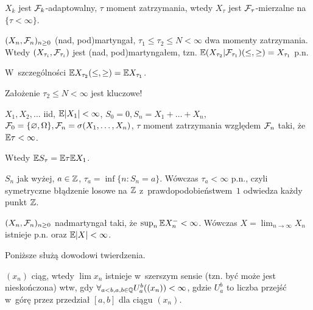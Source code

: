 



	\begin{proposition}
		$X_k$ jest $\mathcal{F}_k$-adaptowalny, $\tau$ moment zatrzymania, 
		wtedy $X_\tau$ jest $\mathcal{F}_\tau$-mierzalne na $\{ \tau < \infty\}$.
	\end{proposition}
	
	\begin{theorem}
		$(X_n, \mathcal{F}_n)_{n \geq 0}$ (nad, pod)martyngał,
		$\tau_1 \leq \tau_2 \leq N < \infty$ dwa momenty zatrzymania.
		Wtedy $(X_{\tau_i}, \mathcal{F}_{\tau_i})$ jest (nad, pod)martyngałem,
		tzn. $\mathbb{E}(X_{\tau_2}|\mathcal{F}_{\tau_1}) (\leq, \geq)= X_{\tau_1}$ p.n.
		
		W~szczególności $\mathbb{E} X_{\tau _2} (\leq,\geq)= \mathbb{E} X_{\tau_1}$.
	\end{theorem}
	
	\begin{remark}
		Założenie $\tau_2 \leq N < \infty$ jest kluczowe!
	\end{remark}
	
	\begin{theorem}
		$X_1, X_2, \ldots$ iid, $\mathbb{E} |X_1| < \infty$, 
		$S_0 = 0, S_n = X_1 + \ldots + X_n$, 
		$\mathcal{F}_0=\{\varnothing, \Omega\}, \mathcal{F}_n=\sigma(X_1, \ldots, X_n)$,
		$\tau$ moment zatrzymania względem $\mathcal{F}_n$ 
		taki, że $\mathbb{E} \tau < \infty$.
		
		Wtedy $\mathbb{E} S_\tau = \mathbb{E} \tau \mathbb{E} X_1$.
	\end{theorem}
	
	\begin{corollary}
		$S_n$ jak wyżej, $a \in {\mathbb{Z}}$, $\tau_a  = \inf\{n : S_n = a\}$.
		Wówczas $\tau_a < \infty$ p.n., czyli symetryczne błądzenie losowe na ${\mathbb{Z}}$ z~prawdopodobieństwem~$1$ odwiedza każdy punkt ${\mathbb{Z}}$.
	\end{corollary}
	
	\begin{theorem}
		$(X_n, \mathcal{F}_n)_{n \geq 0}$ nadmartyngał 
		taki, że $\sup_n \mathbb{E} X_n^- < \infty$. 
		Wówczas $X = \lim_{n \to \infty} X_n$ istnieje p.n. 
		oraz $\mathbb{E} |X| < \infty$.
	\end{theorem}
	
	Poniższe służą dowodowi twierdzenia.
	
	\begin{fact}
		$(x_n)$ ciąg, wtedy $\lim x_n$ istnieje w~szerszym sensie 
		(tzn. być może jest nieskończona) wtw, gdy 
		$\forall_{a < b, a, b \in {\mathbb{Q}}} U_a^b((x_n)) < \infty$,
		gdzie $U_a^b$ to liczba przejść w~górę przez przedział 
		$[a,b]$ dla ciągu $(x_n)$.
	\end{fact}
	

